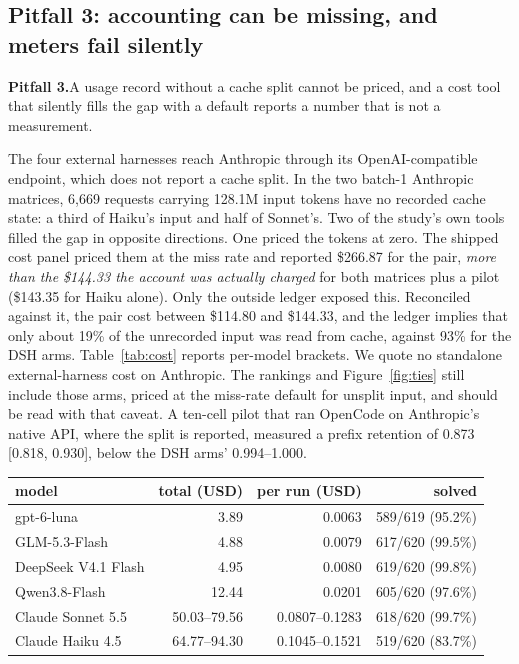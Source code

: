 \documentclass[10pt]{article}
\newenvironment{inlinetable}{\par\medskip\noindent\begin{minipage}{\linewidth}\centering\small}{\end{minipage}\par\bigskip}
\newenvironment{pitfall}[1]{\par\medskip\noindent\begin{lrbox}{\pitbox}\begin{minipage}{\dimexpr\linewidth-2\fboxsep-2\fboxrule\relax}\small\textbf{#1}\enskip}{\end{minipage}\end{lrbox}\fbox{\usebox{\pitbox}}\par\medskip}
\begin{document}
\subsection{Pitfall 3: accounting can be missing, and meters fail silently}\label{sec:p3}

\begin{pitfall}{Pitfall 3.}A usage record without a cache split cannot be priced, and a cost tool
that silently fills the gap with a default reports a number that is not a measurement.\end{pitfall}

The four external harnesses reach Anthropic through its OpenAI-compatible endpoint, which does not
report a cache split. In the two batch-1 Anthropic matrices, 6,669 requests carrying 128.1M input
tokens have no recorded cache state: a third of Haiku's input and half of Sonnet's. Two of the study's
own tools filled the gap in opposite directions. One priced the tokens at zero. The shipped cost panel
priced them at the miss rate and reported \$266.87 for the pair, \emph{more than the \$144.33 the
account was actually charged} for both matrices plus a pilot (\$143.35 for Haiku alone). Only the outside
ledger exposed this. Reconciled against it, the pair cost between \$114.80 and \$144.33, and the
ledger implies that only about 19\% of the unrecorded input was read from cache, against 93\% for the
DSH arms. Table~\ref{tab:cost} reports per-model brackets. We quote no standalone external-harness cost on
Anthropic. The rankings and Figure~\ref{fig:ties} still include those arms, priced at the miss-rate
default for unsplit input, and should be read with that caveat. A ten-cell pilot that ran OpenCode on Anthropic's native API, where the split is reported,
measured a prefix retention of 0.873 [0.818, 0.930], below the DSH arms' 0.994--1.000.

\begin{inlinetable}
\label{tab:cost}
\begin{tabular}{@{}lrrr@{}}
\toprule
model & total (USD) & per run (USD) & solved \\
\midrule
gpt-6-luna & 3.89 & 0.0063 & 589/619 (95.2\%) \\
GLM-5.3-Flash & 4.88 & 0.0079 & 617/620 (99.5\%) \\
DeepSeek V4.1 Flash & 4.95 & 0.0080 & 619/620 (99.8\%) \\
Qwen3.8-Flash & 12.44 & 0.0201 & 605/620 (97.6\%) \\
Claude Sonnet 5.5 & 50.03--79.56 & 0.0807--0.1283 & 618/620 (99.7\%) \\
Claude Haiku 4.5 & 64.77--94.30 & 0.1045--0.1521 & 519/620 (83.7\%) \\
\bottomrule
\end{tabular}
\end{inlinetable}
\end{document}
